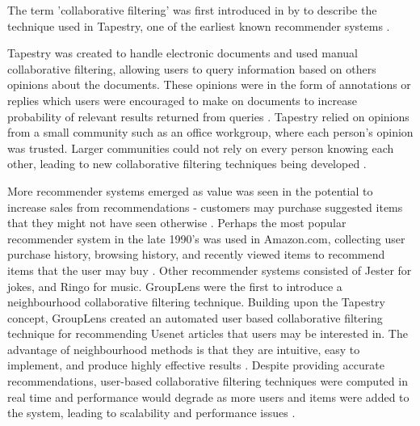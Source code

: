 The term 'collaborative filtering' was first introduced in \citeyear{goldberg1992using} by \citeauthor{goldberg1992using} to describe the technique used in Tapestry, one of the earliest known recommender systems \cite{koren2009matrix,  goldberg1992using, itembased, survey}.

Tapestry \cite{goldberg1992using} was created to handle electronic documents and used manual collaborative filtering, allowing users to query information based on others opinions about the documents. These opinions were in the form of annotations or replies which users were encouraged to make on documents to increase probability of relevant results returned from queries \cite{schafer2007collaborative}. Tapestry relied on opinions from a small community such as an office workgroup, where each person's opinion was trusted. Larger communities could not rely on every person knowing each other, leading to new collaborative filtering techniques being developed \cite{itembased}. 

More recommender systems emerged as value was seen in the potential to increase sales from recommendations - customers may purchase suggested items that they might not have seen otherwise \cite{schafer2007collaborative}. Perhaps the most popular recommender system in the late 1990's was used in Amazon.com, collecting user purchase history, browsing history, and recently viewed items to recommend items that the user may buy \cite{schafer2007collaborative}. Other recommender systems consisted of Jester \cite{goldberg} for jokes, and Ringo \cite{ringo} for music.
GroupLens \cite{grouplens} were the first to introduce a neighbourhood collaborative filtering technique. Building upon the Tapestry concept, GroupLens created an automated user based collaborative filtering technique for recommending Usenet articles that users may be interested in. The advantage of neighbourhood methods is that they are intuitive, easy to implement, and produce highly effective results \cite{survey, scalable}. Despite providing accurate recommendations, user-based collaborative filtering techniques were computed in real time and performance would degrade as more users and items were added to the system, leading to scalability and performance issues \cite{dimension, itembased, evaluationitem}.

